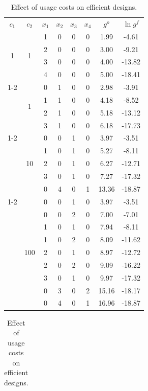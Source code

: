 \documentclass[11pt,authoryear,a4paper]{article}
\theoremstyle{definition}
\begin{document}
\begin{table}[tbp]
{    \begin{tabular}{cccccccc}
    \hline
    $c_1$ & $c_2$ & $x_1$ & $x_2$ & $x_3$ & $x_4$ & $g^o$ & $\ln g^f$\\ 
         \multirow{4}{*}{1} & \multirow{4}{*}{1} & 1 & 0 & 0 & 0 & 1.99 & -4.61\\
         && 2 & 0 & 0 & 0 & 3.00 & -9.21\\
         && 3 & 0 & 0 & 0 & 4.00 & -13.82\\
         && 4 & 0 & 0 & 0 & 5.00 & -18.41\\
         \cmidrule{1-2}
         \multirow{4}{*}{10} & \multirow{4}{*}{1} & 0 & 1 & 0 & 0 & 2.98 & -3.91\\
         &&    1 & 1 & 0 & 0 & 4.18 & -8.52\\
         &&    2 & 1 & 0 & 0 & 5.18 & -13.12\\
         &&    3 & 1 & 0 & 0 & 6.18 & -17.73\\
         \cmidrule{1-2}
         \multirow{5}{*}{10} & \multirow{5}{*}{10} & 0 & 0 & 1 & 0 & 3.97 & -3.51\\
          &&    1 & 0 & 1 & 0 & 5.27 & -8.11\\
          &&    2 & 0 & 1 & 0 & 6.27 & -12.71\\
          &&    3 & 0 & 1 & 0 & 7.27 & -17.32\\
          &&    0 & 4 & 0 & 1 & 13.36 & -18.87\\
        \cmidrule{1-2}
        \multirow{9}{*}{100} & \multirow{9}{*}{100} & 0 & 0 & 1 & 0 & 3.97 & -3.51\\
        &&      0 & 0 & 2 & 0 & 7.00 & -7.01\\
        &&      1 & 0 & 1 & 0 & 7.94 & -8.11\\
        &&      1 & 0 & 2 & 0 & 8.09 & -11.62\\
        &&      2 & 0 & 1 & 0 & 8.97 & -12.72\\
        &&      2 & 0 & 2 & 0 & 9.09 & -16.22\\
        &&      3 & 0 & 1 & 0 & 9.97 & -17.32\\
        &&      0 & 3 & 0 & 2 & 15.16 & -18.17\\
        &&      0 & 4 & 0 & 1 & 16.96 & -18.87\\
        \hline
    \end{tabular}
    \caption{Effect of usage costs on efficient designs.}
    \label{tab:usageCosts}
    }
    \hfill
    \parbox{.45\linewidth}{
\centering
    \begin{tabular}{cccccccc}

\end{tabular}}
\end{table}
\end{document}
